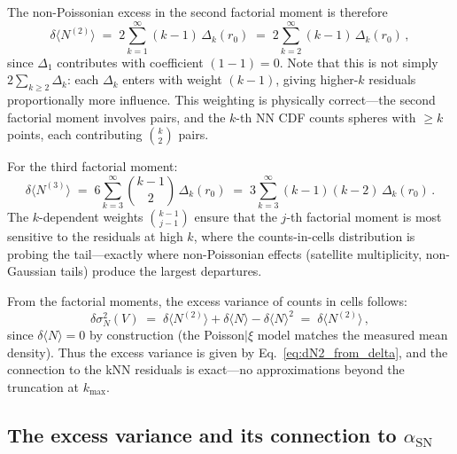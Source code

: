 The non-Poissonian excess in the second factorial moment is therefore
\begin{equation}
  \delta\!\langle N^{(2)}\rangle \;=\; 2\sum_{k=1}^{\infty} (k-1)\,\Delta_k(r_0) \;=\; 2\sum_{k=2}^{\infty} (k-1)\,\Delta_k(r_0)\,,
  \label{eq:dN2_from_delta}
\end{equation}
since $\Delta_1$ contributes with coefficient $(1-1)=0$.  Note that this is not simply $2\sum_{k\geq 2}\Delta_k$: each $\Delta_k$ enters with weight $(k-1)$, giving higher-$k$ residuals proportionally more influence.  This weighting is physically correct---the second factorial moment involves pairs, and the $k$-th NN CDF counts spheres with $\geq k$ points, each contributing $\binom{k}{2}$ pairs.

For the third factorial moment:
\begin{equation}
  \delta\!\langle N^{(3)}\rangle \;=\; 6\sum_{k=3}^{\infty} \binom{k-1}{2}\,\Delta_k(r_0) \;=\; 3\sum_{k=3}^{\infty}(k-1)(k-2)\,\Delta_k(r_0)\,.
  \label{eq:dN3_from_delta}
\end{equation}
The $k$-dependent weights $\binom{k-1}{j-1}$ ensure that the $j$-th factorial moment is most sensitive to the residuals at high $k$, where the counts-in-cells distribution is probing the tail---exactly where non-Poissonian effects (satellite multiplicity, non-Gaussian tails) produce the largest departures.

From the factorial moments, the excess variance of counts in cells follows:
\begin{equation}
  \delta\sigma^2_N(V) \;=\; \delta\!\langle N^{(2)}\rangle + \delta\!\langle N\rangle - \delta\!\langle N\rangle^2 \;=\; \delta\!\langle N^{(2)}\rangle\,,
  \label{eq:var_from_factorial}
\end{equation}
since $\delta\!\langle N\rangle = 0$ by construction (the Poisson$|\xi$ model matches the measured mean density).  Thus the excess variance is given by Eq.~\eqref{eq:dN2_from_delta}, and the connection to the kNN residuals is exact---no approximations beyond the truncation at $k_{\max}$.

\subsection{The excess variance and its connection to $\alpha_{\mathrm{SN}}$}
\label{sec:excess_variance}

